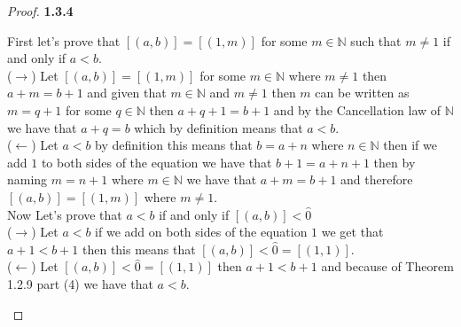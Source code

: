 \documentclass[11pt]{article}
\newcommand{\N}{\mathbb{N}}
\theoremstyle{definition}
\begin{document}
\begin{proof}{\textbf{1.3.4}}
\begin{itemize}
        First let's prove that $[(a,b)]=[(1,m)]$ for some $m \in \N$ such that
        $m \neq 1$ if and only if $a<b$.\\
        ($\rightarrow$) Let $[(a,b)]=[(1,m)]$ for some $m \in \N$ where $m \neq 1$ then
        $a+m=b+1$ and given that $m\in\N$ and $m \neq 1$ then $m$ can be written as
        $m = q +1$ for some $q\in\N$ then $a+q+1=b+1$ and by the Cancellation law of
        $\N$ we have that $a+q=b$ which by definition means that $a<b$.\\
        ($\leftarrow$) Let $a<b$ by definition this means that $b = a +n$ where $n\in\N$
        then if we add $1$ to both sides of the equation we have that
        $b + 1 = a + n + 1$ then by naming $m = n + 1$ where $m \in \N$ we have that
        $a+m=b+1$ and therefore $[(a,b)]=[(1,m)]$ where $m \neq 1$.\\
        Now Let's prove that $a<b$ if and only if $[(a,b)]<\hat{0}$\\
        ($\rightarrow$) Let $a<b$  if we add on both sides of the equation $1$ we get
        that $a+1<b+1$ then this means that $[(a,b)]<\hat{0}=[(1,1)]$.\\
        ($\leftarrow$) Let $[(a,b)]<\hat{0}=[(1,1)]$ then $a+1<b+1$ and because of
        Theorem 1.2.9 part (4) we have that $a<b$.
    \end{itemize}
    \end{proof}
\end{document}
